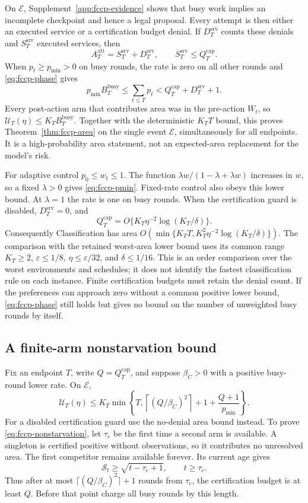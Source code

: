 \documentclass[11pt]{article}
\theoremstyle{remark}
\begin{document}
On $\mathcal E$, Supplement~\ref{app:fccp-evidence} shows that busy
work implies an incomplete checkpoint and hence a legal proposal.
Every attempt is then either an executed service or a certification
budget denial. If $D_T^{\mathrm{srv}}$ counts these denials and
$S_T^{\mathrm{srv}}$ executed services, then
\[
 A_T^{\mathrm{att}}=S_T^{\mathrm{srv}}+D_T^{\mathrm{srv}},\qquad
 S_T^{\mathrm{srv}}\le Q_T^{\mathrm{cap}}.
\]
When $p_t\ge p_{\min}>0$ on busy rounds, the rate is zero on all
other rounds and \eqref{eq:fccp-phase} gives
\[
 p_{\min}B_T^{\mathrm{busy}}\le\sum_{t\le T}p_t
           <Q_T^{\mathrm{cap}}+D_T^{\mathrm{srv}}+1.
\]
Every post-action arm that contributes area was in the pre-action
$W_t$, so $\mathcal U_T(\eta)\le K_TB_T^{\mathrm{busy}}$.
Together with the deterministic $K_TT$ bound, this proves
Theorem~\ref{thm:fccp-area} on the single event $\mathcal E$,
simultaneously for all endpoints. It is a high-probability area
statement, not an expected-area replacement for the model's risk.

For adaptive control $p_0\le w_t\le1$. The function
$\lambda w/(1-\lambda+\lambda w)$ increases in $w$, so a fixed
$\lambda>0$ gives \eqref{eq:fccp-pmin}. Fixed-rate control also obeys
this lower bound. At $\lambda=1$ the rate is one on busy rounds.
When the certification guard is disabled,
$D_T^{\mathrm{srv}}=0$, and
\[
 Q_T^{\mathrm{cap}}=O\{K_T\eta^{-2}\log(K_T/\delta)\}.
\]
Consequently Classification has area
$O(\min\{K_TT,K_T^2\eta^{-2}\log(K_T/\delta)\})$.
The comparison with the retained worst-area lower bound uses its
common range $K_T\ge2$, $\varepsilon\le1/8$,
$\eta\le\varepsilon/32$, and $\delta\le1/16$.
This is an order comparison over the worst environments and schedules;
it does not identify the fastest classification rule on each instance.
Finite certification budgets must retain the denial count. If the
preferences can approach zero without a common positive lower bound,
\eqref{eq:fccp-phase} still holds but gives no bound on the number of
unweighted busy rounds by itself.

\subsection{A finite-arm nonstarvation bound}
Fix an endpoint $T$, write $Q=Q_T^{\mathrm{cap}}$, and suppose
$\beta_C>0$ with a positive busy-round lower rate. On $\mathcal E$,
\begin{equation}\label{eq:fccp-nonstarvation}
 \mathcal U_T(\eta)\le K_T\min\left\{T,
       \left\lceil(Q/\beta_C)^2\right\rceil+1+
                         \frac{Q+1}{p_{\min}}\right\}.
\end{equation}
For a disabled certification guard use the no-denial area bound
instead. To prove \eqref{eq:fccp-nonstarvation}, let $\tau_c$ be
the first time a second arm is available. A singleton is certified
positive without observations, so it contributes no unresolved area.
The first competitor remains available forever. Its current age gives
\[
 \mathcal S_t\ge\sqrt{t-\tau_c+1},\qquad t\ge\tau_c.
\]
Thus after at most $\lceil(Q/\beta_C)^2\rceil+1$ rounds from
$\tau_c$, the certification budget is at least $Q$. Before that
point charge all busy rounds by this length.
\end{document}
